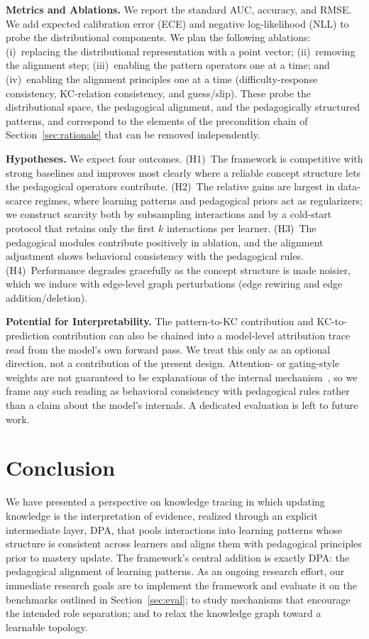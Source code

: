 \documentclass[conference]{IEEEtran}
\begin{document}
\textbf{Metrics and Ablations.} We report the standard AUC, accuracy, and RMSE. We add expected calibration error (ECE) and negative log-likelihood (NLL) to probe the distributional components. We plan the following ablations: (i)~replacing the distributional representation with a point vector; (ii)~removing the alignment step; (iii)~enabling the pattern operators one at a time; and (iv)~enabling the alignment principles one at a time (difficulty-response consistency, KC-relation consistency, and guess/slip). These probe the distributional space, the pedagogical alignment, and the pedagogically structured patterns, and correspond to the elements of the precondition chain of Section~\ref{sec:rationale} that can be removed independently.

\textbf{Hypotheses.} We expect four outcomes. (H1)~The framework is competitive with strong baselines and improves most clearly where a reliable concept structure lets the pedagogical operators contribute. (H2)~The relative gains are largest in data-scarce regimes, where learning patterns and pedagogical priors act as regularizers; we construct scarcity both by subsampling interactions and by a cold-start protocol that retains only the first $k$ interactions per learner. (H3)~The pedagogical modules contribute positively in ablation, and the alignment adjustment shows behavioral consistency with the pedagogical rules. (H4)~Performance degrades gracefully as the concept structure is made noisier, which we induce with edge-level graph perturbations (edge rewiring and edge addition/deletion).

\smallskip\noindent\textbf{Potential for Interpretability.} The pattern-to-KC contribution and KC-to-prediction contribution can also be chained into a model-level attribution trace read from the model's own forward pass. We treat this only as an optional direction, not a contribution of the present design. Attention- or gating-style weights are not guaranteed to be explanations of the internal mechanism~\cite{jain2019attention,wiegreffe2019attention}, so we frame any such reading as behavioral consistency with pedagogical rules rather than a claim about the model's internals. A dedicated evaluation is left to future work.

\section{Conclusion}
\label{sec:conclusion}

We have presented a perspective on knowledge tracing in which updating knowledge is the interpretation of evidence, realized through an explicit intermediate layer, DPA, that pools interactions into learning patterns whose structure is consistent across learners and aligns them with pedagogical principles prior to mastery update. The framework's central addition is exactly DPA: the pedagogical alignment of learning patterns. As an ongoing research effort, our immediate research goals are to implement the framework and evaluate it on the benchmarks outlined in Section~\ref{sec:eval}; to study mechanisms that encourage the intended role separation; and to relax the knowledge graph toward a learnable topology.



\end{document}
